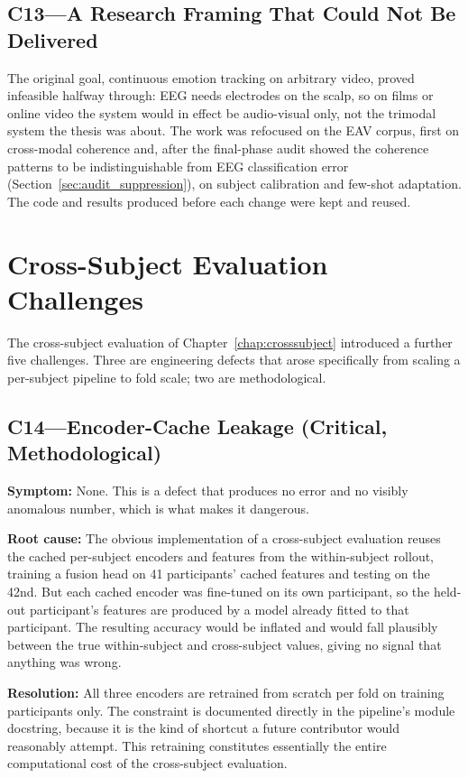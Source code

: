 \subsection*{C13---A Research Framing That Could Not Be Delivered}
The original goal, continuous emotion tracking on arbitrary video, proved infeasible halfway through: EEG needs electrodes on the scalp, so on films or online video the system would in effect be audio-visual only, not the trimodal system the thesis was about. The work was refocused on the EAV corpus, first on cross-modal coherence and, after the final-phase audit showed the coherence patterns to be indistinguishable from EEG classification error (Section~\ref{sec:audit_suppression}), on subject calibration and few-shot adaptation. The code and results produced before each change were kept and reused.

\section{Cross-Subject Evaluation Challenges}
\label{sec:cs_challenges}

The cross-subject evaluation of Chapter~\ref{chap:crosssubject} introduced a further
five challenges. Three are engineering defects that arose specifically from scaling a
per-subject pipeline to fold scale; two are methodological.

\subsection*{C14---Encoder-Cache Leakage (Critical, Methodological)}

\textbf{Symptom:} None. This is a defect that produces no error and no visibly
anomalous number, which is what makes it dangerous.

\textbf{Root cause:} The obvious implementation of a cross-subject evaluation reuses
the cached per-subject encoders and features from the within-subject rollout, training
a fusion head on 41 participants' cached features and testing on the 42nd. But each
cached encoder was fine-tuned on its own participant, so the held-out participant's
features are produced by a model already fitted to that participant. The resulting
accuracy would be inflated and would fall plausibly between the true within-subject
and cross-subject values, giving no signal that anything was wrong.

\textbf{Resolution:} All three encoders are retrained from scratch per fold on
training participants only. The constraint is documented directly in the pipeline's
module docstring, because it is the kind of shortcut a future contributor would
reasonably attempt. This retraining constitutes essentially the entire computational
cost of the cross-subject evaluation.

